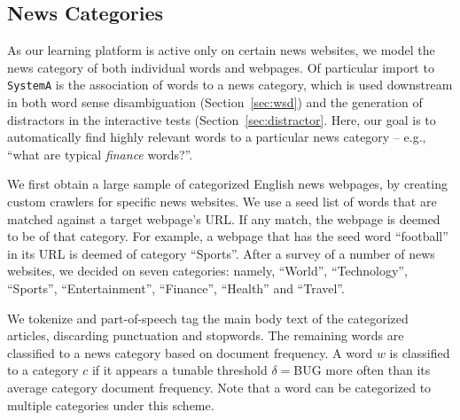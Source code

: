 \subsection{News Categories}
\label{subsec:category}

As our learning platform is active only on certain news websites, we
model the news category of both individual words and webpages.  Of
particular import to {\tt SystemA} is the association of words to a
news category, which is used downstream in both word sense
disambiguation (Section~\ref{sec:wsd}) and the generation of
distractors in the interactive tests (Section~\ref{sec:distractor}.
Here, our goal is to automatically find highly relevant words to a
particular news category -- e.g., ``what are typical {\it finance}
words?''.  

We first obtain a large sample of categorized English news webpages,
by creating custom crawlers for specific news websites.  We use a seed
list of words that are matched against a target webpage's URL.  If any
match, the webpage is deemed to be of that category.  For example, a
webpage that has the seed word ``football'' in its URL is deemed of
category ``Sports''.  After a survey of a number of news websites, we
decided on seven categories: namely, ``World'', ``Technology”,
“Sports”, “Entertainment'', ``Finance'', ``Health'' and
``Travel''.  

We tokenize and part-of-speech tag the main body text of the
categorized articles, discarding punctuation and stopwords.  The
remaining words are classified to a news category based on document
frequency.  A word $w$ is classified to a category $c$ if it appears a
tunable threshold $\delta=$BUG more often than its average category
document frequency.  Note that a word can be categorized to multiple
categories under this scheme.









